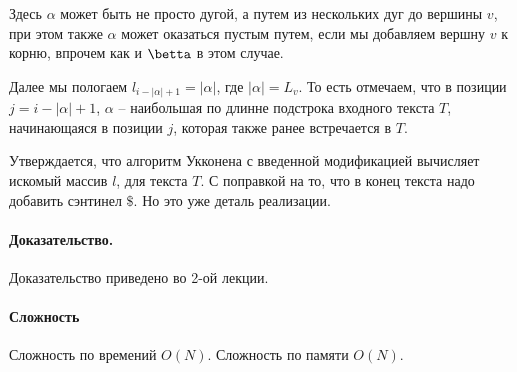 \documentclass[12pt]{article}
\begin{document}
Здесь $ \alpha $ может быть не просто дугой, а путем из нескольких дуг до
вершины $ v $, при этом также $ \alpha $ может оказаться пустым путем, если
мы добавляем вершну $ v $ к корню, впрочем как и $\betta$ в этом случае.

Далее мы пологаем $ l_{i - |\alpha| + 1} = |\alpha| $, где $ |\alpha| = L_v $.
То есть отмечаем, что в позиции $ j = i - |\alpha| + 1 $,  $ \alpha $ --
наибольшая по длинне подстрока входного текста $ T $, начинающаяся в
позиции $ j $, которая также ранее встречается в $ T $.

Утверждается, что алгоритм Укконена с введенной модификацией вычисляет
искомый массив $ l $, для текста $ T $. С поправкой на то, что в конец
текста надо добавить сэнтинел $\$$. Но это уже деталь реализации.


\paragraph{Доказательство.}
Доказательство приведено во 2-ой лекции.






\paragraph{Сложность}
Сложность по времений $ O(N) $.
Сложность по памяти $ O(N) $.
\end{document}

